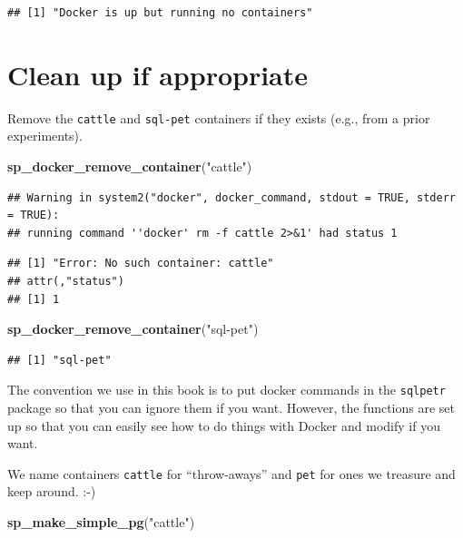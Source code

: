 \documentclass[]{book}
\newenvironment{Shaded}{\begin{snugshade}}{\end{snugshade}}
\newcommand{\KeywordTok}[1]{\textcolor[rgb]{0.13,0.29,0.53}{\textbf{#1}}}
\newcommand{\NormalTok}[1]{#1}
\newcommand{\StringTok}[1]{\textcolor[rgb]{0.31,0.60,0.02}{#1}}
\theoremstyle{definition}
\theoremstyle{definition}
\theoremstyle{definition}
\theoremstyle{remark}
\begin{document}
\begin{verbatim}
## [1] "Docker is up but running no containers"
\end{verbatim}

\hypertarget{clean-up-if-appropriate}{%
\section{Clean up if appropriate}\label{clean-up-if-appropriate}}

Remove the \texttt{cattle} and \texttt{sql-pet} containers if they
exists (e.g., from a prior experiments).

\begin{Shaded}
\begin{Highlighting}[]
\KeywordTok{sp_docker_remove_container}\NormalTok{(}\StringTok{"cattle"}\NormalTok{)}
\end{Highlighting}
\end{Shaded}

\begin{verbatim}
## Warning in system2("docker", docker_command, stdout = TRUE, stderr = TRUE):
## running command ''docker' rm -f cattle 2>&1' had status 1
\end{verbatim}

\begin{verbatim}
## [1] "Error: No such container: cattle"
## attr(,"status")
## [1] 1
\end{verbatim}

\begin{Shaded}
\begin{Highlighting}[]
\KeywordTok{sp_docker_remove_container}\NormalTok{(}\StringTok{"sql-pet"}\NormalTok{)}
\end{Highlighting}
\end{Shaded}

\begin{verbatim}
## [1] "sql-pet"
\end{verbatim}

The convention we use in this book is to put docker commands in the
\texttt{sqlpetr} package so that you can ignore them if you want.
However, the functions are set up so that you can easily see how to do
things with Docker and modify if you want.

We name containers \texttt{cattle} for ``throw-aways'' and \texttt{pet}
for ones we treasure and keep around. :-)

\begin{Shaded}
\begin{Highlighting}[]
\KeywordTok{sp_make_simple_pg}\NormalTok{(}\StringTok{"cattle"}\NormalTok{)}
\end{Highlighting}
\end{Shaded}
\end{document}
